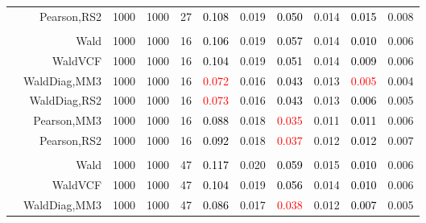 \documentclass[
]{article}
\begin{document}
\begin{table}[H]
{\begin{tabular}[t]{lrrrrrrrlrr}
\hspace{1em} & Pearson,RS2 & 1000 & 1000 & 27 & \textcolor{black}{0.108} & 0.019 & \textcolor{black}{0.050} & 0.014 & \textcolor{black}{0.015} & 0.008\\
\cmidrule{1-11}
\addlinespace[0.3em]
\multicolumn{11}{l}{\textbf{2F 10V}}\\
\hspace{1em} & Wald & 1000 & 1000 & 16 & \textcolor{black}{0.106} & 0.019 & \textcolor{black}{0.057} & 0.014 & \textcolor{black}{0.010} & 0.006\\

\hspace{1em} & WaldVCF & 1000 & 1000 & 16 & \textcolor{black}{0.104} & 0.019 & \textcolor{black}{0.051} & 0.014 & \textcolor{black}{0.009} & 0.006\\

\hspace{1em} & WaldDiag,MM3 & 1000 & 1000 & 16 & \textcolor{red}{0.072} & 0.016 & \textcolor{black}{0.043} & 0.013 & \textcolor{red}{0.005} & 0.004\\

\hspace{1em} & WaldDiag,RS2 & 1000 & 1000 & 16 & \textcolor{red}{0.073} & 0.016 & \textcolor{black}{0.043} & 0.013 & \textcolor{black}{0.006} & 0.005\\

\hspace{1em} & Pearson,MM3 & 1000 & 1000 & 16 & \textcolor{black}{0.088} & 0.018 & \textcolor{red}{0.035} & 0.011 & \textcolor{black}{0.011} & 0.006\\

\hspace{1em} & Pearson,RS2 & 1000 & 1000 & 16 & \textcolor{black}{0.092} & 0.018 & \textcolor{red}{0.037} & 0.012 & \textcolor{black}{0.012} & 0.007\\
\cmidrule{1-11}
\addlinespace[0.3em]
\multicolumn{11}{l}{\textbf{3F 15V}}\\
\hspace{1em} & Wald & 1000 & 1000 & 47 & \textcolor{black}{0.117} & 0.020 & \textcolor{black}{0.059} & 0.015 & \textcolor{black}{0.010} & 0.006\\

\hspace{1em} & WaldVCF & 1000 & 1000 & 47 & \textcolor{black}{0.104} & 0.019 & \textcolor{black}{0.056} & 0.014 & \textcolor{black}{0.010} & 0.006\\

\hspace{1em} & WaldDiag,MM3 & 1000 & 1000 & 47 & \textcolor{black}{0.086} & 0.017 & \textcolor{red}{0.038} & 0.012 & \textcolor{black}{0.007} & 0.005\\


\end{tabular}}
\end{table}
\end{document}

